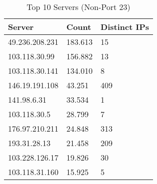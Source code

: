 \begin{table}
\caption{Top 10 Servers (Non-Port 23)}
\label{tab:top10_servers_non_23}
\begin{tabular}{lll}
\toprule
Server & Count & Distinct IPs \\
\midrule
49.236.208.231 & 183.613 & 15 \\
103.118.30.99 & 156.882 & 13 \\
103.118.30.141 & 134.010 & 8 \\
146.19.191.108 & 43.251 & 409 \\
141.98.6.31 & 33.534 & 1 \\
103.118.30.5 & 28.799 & 7 \\
176.97.210.211 & 24.848 & 313 \\
193.31.28.13 & 21.458 & 209 \\
103.228.126.17 & 19.826 & 30 \\
103.118.31.160 & 15.925 & 5 \\
\bottomrule
\end{tabular}
\end{table}
